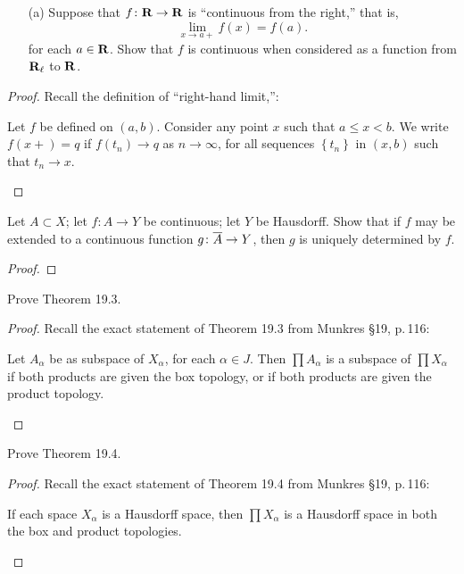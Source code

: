 \begin{problem}[Munkres \S18, p.\,111, \#7(a)]
\begin{enumerate}[noitemsep]
\item[(a)] Suppose that $f\colon\mathbf{R}\to\mathbf{R}$ is ``continuous from
  the right,'' that is,
  \[
    \lim_{x\to a+}f(x)=f(a).
  \]
  for each $a\in\mathbf{R}$. Show that $f$ is continuous when considered
  as a function from $\mathbf{R}_\ell$ to $\mathbf{R}$.
\end{enumerate}
\end{problem}
\begin{proof}
Recall the definition of ``right-hand limit,'':
\begin{definition*}
Let $f$ be defined on $(a,b)$. Consider any point $x$ such that
$a\leq x<b$. We write $f(x+)=q$ if $f(t_n)\to q$ as $n\to\infty$,
for all sequences $\left\{t_n\right\}$ in $(x,b)$ such that
$t_n\to x$.
\end{definition*}

\end{proof}
\newpage
\begin{problem}[Munkres \S18, p.\,112, \#13]
Let $A\subset X$; let $f\colon A\to Y$ be continuous; let $Y$ be
Hausdorff. Show that if $f$ may be extended to a continuous
function $g\colon\overline{A}\to Y$, then $g$ is uniquely determined
by $f$.
\end{problem}
\begin{proof}
\end{proof}
\newpage
\begin{problem}[Munkres \S19, p.\,118, \#2]
Prove Theorem 19.3.
\end{problem}
\begin{proof}
Recall the exact statement of Theorem 19.3 from Munkres \S19,
p.\,116:
\begin{theorem*}
Let $A_\alpha$ be as subspace of $X_\alpha$, for each $\alpha\in
J$. Then $\prod A_\alpha$ is a subspace of $\prod X_\alpha$ if
both products are given the box topology, or if both products are
given the product topology.
\end{theorem*}
\end{proof}
\newpage
\begin{problem}[Munkres \S19, p.\,118, \#3]
Prove Theorem 19.4.
\end{problem}
\begin{proof}
Recall the exact statement of Theorem 19.4 from Munkres \S19,
p.\,116:
\begin{theorem*}
If each space $X_\alpha$ is a Hausdorff space, then $\prod
X_\alpha$ is a Hausdorff space in both the box and product
topologies.
\end{theorem*}
\end{proof}
